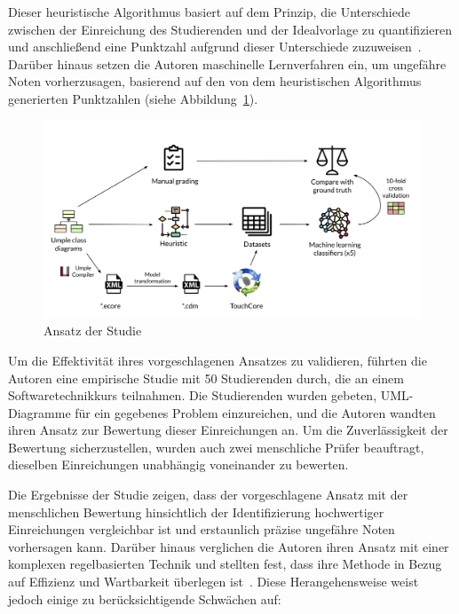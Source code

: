 Dieser heuristische Algorithmus basiert auf dem Prinzip, die Unterschiede zwischen der Einreichung des Studierenden und der
Idealvorlage zu quantifizieren und anschließend eine Punktzahl aufgrund dieser Unterschiede zuzuweisen~\cite{huyck1993efficient}.
Darüber hinaus setzen die Autoren maschinelle Lernverfahren ein, um ungefähre Noten vorherzusagen, basierend auf den von
dem heuristischen Algorithmus generierten Punktzahlen (siehe Abbildung~\ref{fig:ml-approach}).

\begin{figure}
	\centering
	\includegraphics[width=13cm]{images/ml-approach}
	\caption{Ansatz der Studie \cite{boubekeur2020automatic}}
	\label{fig:ml-approach}
\end{figure}

Um die Effektivität ihres vorgeschlagenen Ansatzes zu validieren, führten die Autoren eine empirische Studie mit 50
Studierenden durch, die an einem Softwaretechnikkurs teilnahmen. Die Studierenden wurden gebeten, UML-Diagramme für ein
gegebenes Problem einzureichen, und die Autoren wandten ihren Ansatz zur Bewertung dieser Einreichungen an.
Um die Zuverlässigkeit der Bewertung sicherzustellen, wurden auch zwei menschliche Prüfer beauftragt, dieselben
Einreichungen unabhängig voneinander zu bewerten.

Die Ergebnisse der Studie zeigen, dass der vorgeschlagene Ansatz mit der menschlichen Bewertung hinsichtlich der
Identifizierung hochwertiger Einreichungen vergleichbar ist und erstaunlich präzise ungefähre Noten vorhersagen kann.
Darüber hinaus verglichen die Autoren ihren Ansatz mit einer komplexen regelbasierten Technik und stellten fest, dass
ihre Methode in Bezug auf Effizienz und Wartbarkeit überlegen ist~\cite{boubekeur2020automatic}. Diese Herangehensweise
weist jedoch einige zu berücksichtigende Schwächen auf:

